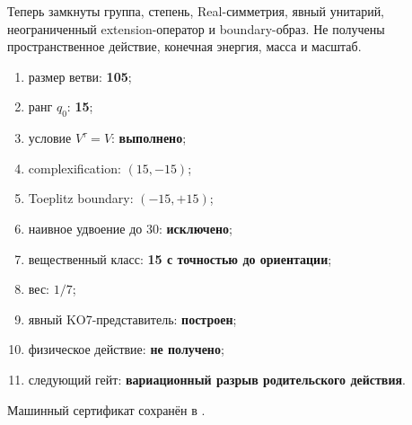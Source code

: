 Теперь замкнуты группа, степень, Real-симметрия, явный унитарий,
неограниченный extension-оператор и boundary-образ. Не получены
пространственное действие, конечная энергия, масса и масштаб.

\begin{protocol}
\begin{enumerate}
 \item размер ветви: \textbf{105};
 \item ранг $q_0$: \textbf{15};
 \item условие $V^\tau=V$: \textbf{выполнено};
 \item complexification: \textbf{$(15,-15)$};
 \item Toeplitz boundary: \textbf{$(-15,+15)$};
 \item наивное удвоение до 30: \textbf{исключено};
 \item вещественный класс: \textbf{15 с точностью до ориентации};
 \item вес: \textbf{$1/7$};
 \item явный KO7-представитель: \textbf{построен};
 \item физическое действие: \textbf{не получено};
 \item следующий гейт: \textbf{вариационный разрыв родительского действия}.
\end{enumerate}
\end{protocol}

Машинный сертификат сохранён в
.